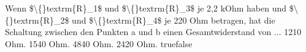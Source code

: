     {Wenn \$\textbackslash\{\}textrm\{R\}\_1\$ und \$\textbackslash\{\}textrm\{R\}\_3\$ je 2,2 kOhm haben und \$\textbackslash\{\}textrm\{R\}\_2\$ und \$\textbackslash\{\}textrm\{R\}\_4\$ je 220 Ohm betragen, hat die Schaltung zwischen den Punkten a und b einen Gesamtwiderstand von ...}
    {1210 Ohm.}
    {1540 Ohm.}
    {4840 Ohm.}
    {2420 Ohm.}
    {true}{false}
